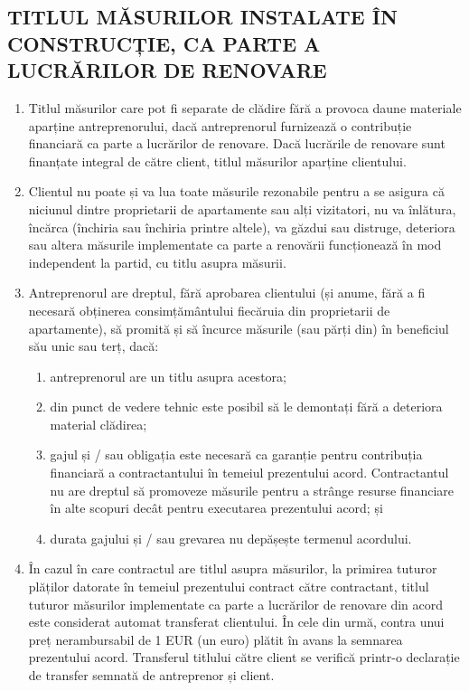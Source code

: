 \begin{multicols}{2}
\subsection{TITLUL MĂSURILOR INSTALATE ÎN CONSTRUCȚIE, CA PARTE A LUCRĂRILOR DE RENOVARE}
\begin{enumerate}
\item Titlul măsurilor care pot fi separate de clădire fără a provoca daune materiale aparține antreprenorului, dacă antreprenorul furnizează o contribuție financiară ca parte a lucrărilor de renovare. Dacă lucrările de renovare sunt finanțate integral de către client, titlul măsurilor aparține clientului.
\item Clientul nu poate și va lua toate măsurile rezonabile pentru a se asigura că niciunul dintre proprietarii de apartamente sau alți vizitatori, nu va înlătura, încărca (închiria sau închiria printre altele), va găzdui sau distruge, deteriora sau altera măsurile implementate ca parte a renovării funcționează în mod independent la partid, cu titlu asupra măsurii.
\item Antreprenorul are dreptul, fără aprobarea clientului (și anume, fără a fi necesară obținerea consimțământului fiecăruia din proprietarii de apartamente), să promită și să încurce măsurile (sau părți din) în beneficiul său unic sau terț, dacă:
\begin{enumerate}
\item antreprenorul are un titlu asupra acestora;
\item din punct de vedere tehnic este posibil să le demontați fără a deteriora material clădirea;
\item gajul și / sau obligația este necesară ca garanție pentru contribuția financiară a contractantului în temeiul prezentului acord. Contractantul nu are dreptul să promoveze măsurile pentru a strânge resurse financiare în alte scopuri decât pentru executarea prezentului acord; și
\item durata gajului și / sau grevarea nu depășește termenul acordului.
\end{enumerate}
\item În cazul în care contractul are titlul asupra măsurilor, la primirea tuturor plăților datorate în temeiul prezentului contract către contractant, titlul tuturor măsurilor implementate ca parte a lucrărilor de renovare din acord este considerat automat transferat clientului. În cele din urmă, contra unui preț nerambursabil de 1 EUR (un euro) plătit în avans la semnarea prezentului acord. Transferul titlului către client se verifică printr-o declarație de transfer semnată de antreprenor și client.
\end{enumerate}


\end{multicols}
